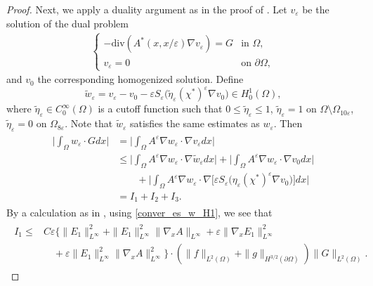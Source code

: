 \documentclass[reqno,12pt]{amsart} %
\theoremstyle{definition}
\theoremstyle{remark}
\numberwithin{equation}{section}
\begin{document}
\begin{proof}
Next,  we apply a duality argument as in the proof of \cite[Lemma 4.1]{Niu20_reiterated}. Let $v_\varepsilon$ be the solution of the dual problem
\begin{align*}
  \begin{cases}
    -\mathrm{div}(A^*(x,{x}/{\varepsilon})\nabla v_\varepsilon) = G &\text{in }\Omega,\\
    v_\varepsilon=0&\text{on }\partial\Omega,
  \end{cases}
\end{align*}
and $v_0$ the corresponding homogenized solution. Define 
$$\widetilde{w}_\varepsilon=v_\varepsilon-v_0-\varepsilon S_\varepsilon\big(\widetilde{\eta}_\varepsilon (\chi^*)^\varepsilon \nabla v_0\big)\in H^1_0(\Omega),$$
where $\widetilde{\eta}_\varepsilon\in C_0^\infty(\Omega)$ is a cutoff function such that $0\leq \widetilde{\eta}_\varepsilon\leq 1$, $\widetilde{\eta}_\varepsilon=1$ on $\Omega\setminus \Omega_{10\varepsilon}$, $\widetilde{\eta}_\varepsilon=0$ on $\Omega_{8\varepsilon}$. Note that $\widetilde{w}_\varepsilon$ satisfies the same estimates as $w_\varepsilon$. Then
\begin{align}\label{eq.weG}
\begin{aligned}
  \bigg|\int_\Omega w_\varepsilon\cdot G dx\bigg|&=\bigg|\int_\Omega A^\varepsilon \nabla w_\varepsilon\cdot \nabla v_\varepsilon dx\bigg|\\&\leq \bigg|\int_{\Omega}A^{\varepsilon}\nabla w_{\varepsilon}\cdot\nabla\widetilde{w}_{\varepsilon}dx\bigg|+\bigg|\int_{\Omega}A^\varepsilon\nabla w_{\varepsilon}\cdot\nabla v_{0}dx\bigg|\\&\qquad+\bigg|\int_{\Omega}A^\varepsilon\nabla w_{\varepsilon}\cdot\nabla\big[\varepsilon S_{\varepsilon}\big(\eta_\varepsilon(\chi^*)^\varepsilon \nabla v_0\big)\big]dx\bigg| \\
  & = I_1 + I_2 + I_3.
\end{aligned}
\end{align}
By a calculation as in \cite[Lemma 4.1]{Niu20_reiterated}, using \eqref{conver_es_w_H1}, we see that
\begin{align}\label{est.I1}
\begin{aligned}
  I_1 \le & C\varepsilon \big\{ \|E_1\|_{L^\infty}^2+\|E_1\|_{L^\infty}^2\|\nabla_xA\|_{L^\infty} + \varepsilon\|\nabla_xE_1\|_{L^\infty}^2\\
  & \quad + \varepsilon\|E_1\|_{L^\infty}^2\|\nabla_xA\|_{L^\infty}^2 \big\} \cdot  \left(\|f\|_{L^2(\Omega)} + \|g\|_{H^{3/2}(\partial \Omega)}\right) \| G \|_{L^2(\Omega)}.
  \end{aligned}

\end{align}
\end{proof}
\end{document}
